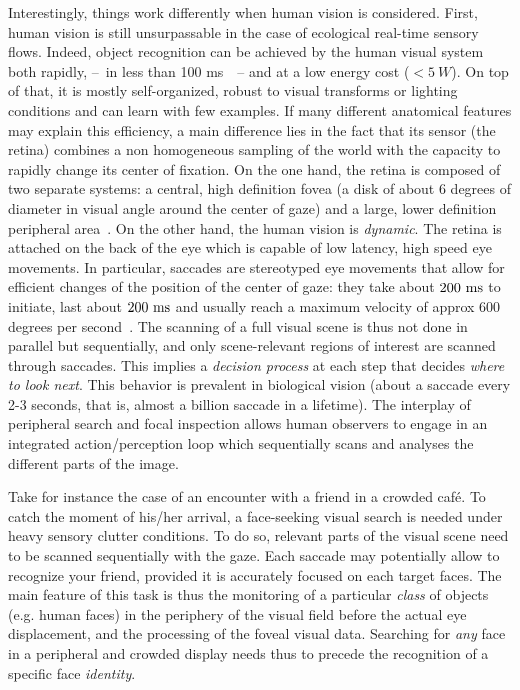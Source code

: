 Interestingly, things work differently when human vision is considered. First, human vision is
still unsurpassable in  the case of ecological real-time sensory flows.
Indeed, object recognition can be achieved by the human visual system both rapidly, --~in less than 100 ms~\cite{Kirchner06}~-- and at a low energy cost ($<5~W$).
On top of that, it is mostly self-organized, robust to visual transforms or lighting conditions and can learn with few examples. If many different anatomical features may explain this efficiency, a main difference lies in the fact that its sensor (the retina) combines a non homogeneous sampling of the world with the capacity to rapidly change its center of fixation. On the one hand, the retina is composed of two separate systems: a central, high definition fovea (a disk of about 6 degrees of diameter in visual angle around the center of gaze) and a large, lower definition peripheral area~\cite{Strasburger11}.
On the other hand, the human vision is \emph{dynamic}. The retina is attached on the back of the eye which is capable of low latency, high speed eye movements. In particular, saccades are stereotyped eye movements that allow for efficient changes of the position of the center of gaze: they take about $200~\si{\milli\second}$ to initiate, last about $200~\si{\milli\second}$ and usually reach a maximum velocity of approx 600 degrees per second~\cite{Bahill75}. The scanning of a full visual scene is thus not done in parallel but sequentially, and only scene-relevant regions of interest are scanned through saccades. This implies a \emph{decision process} at each step that decides \emph{where to look next}. This behavior is prevalent in biological vision (about a saccade every 2-3 seconds, that is, almost a billion saccade in a lifetime). The interplay of peripheral search and focal inspection allows human observers to engage in an integrated action/perception loop which sequentially scans and analyses the different parts of the image.


Take for instance the case of an encounter with a friend in a crowded café. To catch the moment of his/her arrival, a face-seeking visual search is needed under heavy sensory clutter conditions. To do so, relevant parts of the visual scene need to be scanned sequentially with the gaze. Each saccade may potentially allow  to recognize your friend, provided it is accurately focused on each target faces. The main feature of this task is thus the monitoring of a particular \emph{class} of objects (e.g. human faces) in the periphery of the visual field  before the actual eye displacement, and the processing of the foveal visual data.
Searching for \emph{any} face in a peripheral and crowded display needs thus to precede the recognition of a specific face \emph{identity}.

